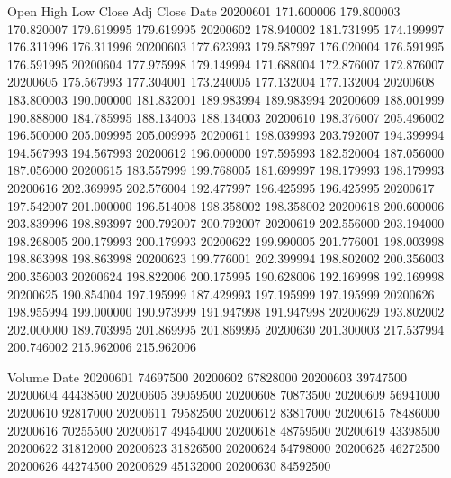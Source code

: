 \documentclass[letterpaper,10pt,english]{jupyterBook}
\begin{document}
\begin{sphinxVerbatim}[commandchars=\\\{\}]
                  Open        High         Low       Close   Adj Close  \PYGZbs{}
Date                                                                     
2020\PYGZhy{}06\PYGZhy{}01  171.600006  179.800003  170.820007  179.619995  179.619995   
2020\PYGZhy{}06\PYGZhy{}02  178.940002  181.731995  174.199997  176.311996  176.311996   
2020\PYGZhy{}06\PYGZhy{}03  177.623993  179.587997  176.020004  176.591995  176.591995   
2020\PYGZhy{}06\PYGZhy{}04  177.975998  179.149994  171.688004  172.876007  172.876007   
2020\PYGZhy{}06\PYGZhy{}05  175.567993  177.304001  173.240005  177.132004  177.132004   
2020\PYGZhy{}06\PYGZhy{}08  183.800003  190.000000  181.832001  189.983994  189.983994   
2020\PYGZhy{}06\PYGZhy{}09  188.001999  190.888000  184.785995  188.134003  188.134003   
2020\PYGZhy{}06\PYGZhy{}10  198.376007  205.496002  196.500000  205.009995  205.009995   
2020\PYGZhy{}06\PYGZhy{}11  198.039993  203.792007  194.399994  194.567993  194.567993   
2020\PYGZhy{}06\PYGZhy{}12  196.000000  197.595993  182.520004  187.056000  187.056000   
2020\PYGZhy{}06\PYGZhy{}15  183.557999  199.768005  181.699997  198.179993  198.179993   
2020\PYGZhy{}06\PYGZhy{}16  202.369995  202.576004  192.477997  196.425995  196.425995   
2020\PYGZhy{}06\PYGZhy{}17  197.542007  201.000000  196.514008  198.358002  198.358002   
2020\PYGZhy{}06\PYGZhy{}18  200.600006  203.839996  198.893997  200.792007  200.792007   
2020\PYGZhy{}06\PYGZhy{}19  202.556000  203.194000  198.268005  200.179993  200.179993   
2020\PYGZhy{}06\PYGZhy{}22  199.990005  201.776001  198.003998  198.863998  198.863998   
2020\PYGZhy{}06\PYGZhy{}23  199.776001  202.399994  198.802002  200.356003  200.356003   
2020\PYGZhy{}06\PYGZhy{}24  198.822006  200.175995  190.628006  192.169998  192.169998   
2020\PYGZhy{}06\PYGZhy{}25  190.854004  197.195999  187.429993  197.195999  197.195999   
2020\PYGZhy{}06\PYGZhy{}26  198.955994  199.000000  190.973999  191.947998  191.947998   
2020\PYGZhy{}06\PYGZhy{}29  193.802002  202.000000  189.703995  201.869995  201.869995   
2020\PYGZhy{}06\PYGZhy{}30  201.300003  217.537994  200.746002  215.962006  215.962006   

              Volume  
Date                  
2020\PYGZhy{}06\PYGZhy{}01  74697500  
2020\PYGZhy{}06\PYGZhy{}02  67828000  
2020\PYGZhy{}06\PYGZhy{}03  39747500  
2020\PYGZhy{}06\PYGZhy{}04  44438500  
2020\PYGZhy{}06\PYGZhy{}05  39059500  
2020\PYGZhy{}06\PYGZhy{}08  70873500  
2020\PYGZhy{}06\PYGZhy{}09  56941000  
2020\PYGZhy{}06\PYGZhy{}10  92817000  
2020\PYGZhy{}06\PYGZhy{}11  79582500  
2020\PYGZhy{}06\PYGZhy{}12  83817000  
2020\PYGZhy{}06\PYGZhy{}15  78486000  
2020\PYGZhy{}06\PYGZhy{}16  70255500  
2020\PYGZhy{}06\PYGZhy{}17  49454000  
2020\PYGZhy{}06\PYGZhy{}18  48759500  
2020\PYGZhy{}06\PYGZhy{}19  43398500  
2020\PYGZhy{}06\PYGZhy{}22  31812000  
2020\PYGZhy{}06\PYGZhy{}23  31826500  
2020\PYGZhy{}06\PYGZhy{}24  54798000  
2020\PYGZhy{}06\PYGZhy{}25  46272500  
2020\PYGZhy{}06\PYGZhy{}26  44274500  
2020\PYGZhy{}06\PYGZhy{}29  45132000  
2020\PYGZhy{}06\PYGZhy{}30  84592500  
\end{sphinxVerbatim}
\end{document}
